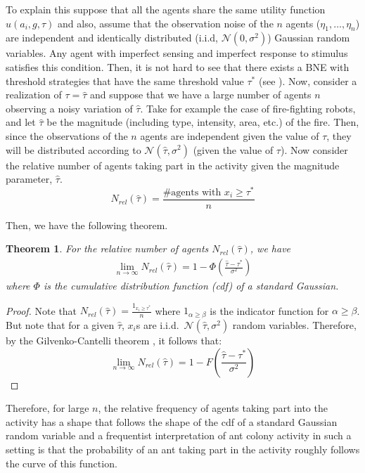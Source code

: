 \documentclass[conference]{ieeeconf}
\newtheorem{theorem}{Theorem}
\begin{document}
To explain this suppose that all the agents share the same utility function $u(a_i,g,\tau)$ and also, assume that the observation noise of the $n$ agents ($\eta_1,\ldots,\eta_n$) are independent and identically distributed (i.i.d, $\mathcal{N}(0,\sigma^2)$) Gaussian random variables. Any agent with imperfect sensing and imperfect response to stimulus satisfies this condition. Then, it is not hard to see that there exists a BNE with threshold strategies that have the same threshold value $\tau^*$ (see  \cite{Morris2000}). Now, consider a realization of $\tau=\hat{\tau}$ and suppose that we have a large number of agents $n$ observing a noisy variation of $\hat{\tau}$. Take for example the case of fire-fighting robots, and let $\hat{\tau}$ be the magnitude (including type, intensity, area, etc.) of the fire. Then, since the observations of the $n$ agents are independent given the value of $\tau$, they will be distributed according to $\mathcal{N}(\hat{\tau},\sigma^2)$ (given the value of $\tau$). Now consider the relative number of agents taking part in the activity given the magnitude parameter, $\hat{\tau}$.
\begin{equation}
	N_{rel}(\hat{\tau})=\frac{\#\text{agents with }x_i\geq \tau^*}{n}
\end{equation}

Then, we have the following theorem.
\begin{theorem}\label{thrm:relativefrequency}
For the relative number of agents $N_{rel}(\hat{\tau})$, we have
\begin{align}
\lim_{n\to\infty}N_{rel}(\hat{\tau})=1-\Phi(\frac{\hat{\tau}-\tau^*}{\sigma^2})
\end{align}
where $\Phi$ is the cumulative distribution function (cdf) of a standard Gaussian. 
\end{theorem}
\begin{proof}
Note that $N_{rel}(\hat{\tau})=\frac{1_{x_i\geq \tau^*}}{n}$ where $1_{\alpha\geq \beta}$ is the indicator function for $\alpha\geq \beta$. But note that for a given $\hat{\tau}$, $x_i$s are i.i.d.\ $\mathcal{N}(\hat{\tau},\sigma^2)$ random variables. Therefore, by the Gilvenko-Cantelli theorem \cite{durrett2010}, it follows that:
\begin{equation}
\lim_{n\to\infty}N_{rel}(\hat{\tau})=1-F(\frac{\hat{\tau}-\tau^*}{\sigma^2})
\end{equation}

\end{proof}
Therefore, for large $n$, the relative frequency of agents taking part into the activity has a shape that follows the shape of the cdf of a standard Gaussian random variable and a frequentist interpretation of ant colony activity in such a setting is that the probability of an ant taking part in the activity roughly follows the curve of this function. 
\end{document}
